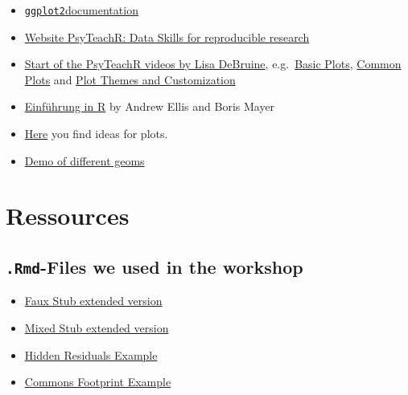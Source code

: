 \documentclass[
  letterpaper,
  DIV=11,
  numbers=noendperiod,
  oneside]{scrreprt}
\begin{document}
\begin{itemize}
\item
  \href{https://ggplot2.tidyverse.org/}{\texttt{ggplot2}documentation}
\item
  \href{https://psyteachr.github.io/reprores-v3}{Website PsyTeachR: Data
  Skills for reproducible research}
\item
  \href{https://youtu.be/90IdULVGmYY}{Start of the PsyTeachR videos by
  Lisa DeBruine}, e.g.~\href{https://youtu.be/tOFQFPRgZ3M}{Basic Plots},
  \href{https://youtu.be/kKlQupjD__g}{Common Plots} and
  \href{https://youtu.be/6pHuCbOh86s}{Plot Themes and Customization}
\item
  \href{https://methodenlehre.github.io/einfuehrung-in-R/chapters/05-plotting.html}{Einführung
  in R} by Andrew Ellis and Boris Mayer
\item
  \href{https://www.data-to-viz.com}{Here} you find ideas for plots.
\item
  \href{https://rstudio-connect.psy.gla.ac.uk/plotdemo}{Demo of
  different geoms}
\end{itemize}


\hypertarget{ressources}{%
\chapter*{Ressources}\label{ressources}}


\hfill\break

\hypertarget{rmd-files-we-used-in-the-workshop}{%
\section*{\texorpdfstring{\texttt{.Rmd}-Files we used in the
workshop}{.Rmd-Files we used in the workshop}}\label{rmd-files-we-used-in-the-workshop}}


\begin{itemize}
\item
  \href{./downloadable_files/faux-stub_extended.Rmd}{Faux Stub extended
  version}
\item
  \href{./downloadable_files/mixed-stub_extended.Rmd}{Mixed Stub
  extended version}
\item
  \href{./downloadable_files/hidden_residuals.Rmd}{Hidden Residuals
  Example}
\item
  \href{./downloadable_files/commons-footprint.Rmd}{Commons Footprint
  Example}
\end{itemize}
\end{document}
